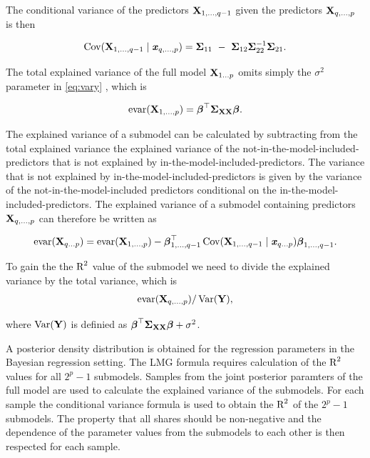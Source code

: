 \documentclass[11pt,a4paper,twoside]{book}\usepackage[]{graphicx}\usepackage[]{color}
\begin{document}
 The conditional variance of the predictors $ {\mathbf{X}}_{1 ,\dotsc, q-1} $ given the predictors  $ {\mathbf{X}}_{q ,\dotsc, p} $ is then
 
          \begin{align*} 
 \cov(\X_{1,\dotsc, q-1} \mid \x_{q ,\dotsc, p}) = \bSigma_{11}\ -\ \bSigma_{12} \bSigma_{22}^{-1}\bSigma_{21} .
       \end{align*}
       
       The total explained variance of the full model ${\mathbf{X}}_{1 \dots p}$ omits simply the $\sigma^2$ parameter in \eqref{eq:vary} , which is

      \begin{align*} 
        \text{evar}({\mathbf{X}}_{1 ,\dotsc, p}) = {\boldsymbol{\beta}}^\top {\boldsymbol{\Sigma}}{}_{{\mathbf{X}} {\mathbf{X}}}  {\boldsymbol{\beta}}. 
   \end{align*}

The explained variance of a submodel can be calculated by subtracting from the total explained variance the explained variance of the not-in-the-model-included-predictors that is not explained by in-the-model-included-predictors. The variance that is not explained by in-the-model-included-predictors is given by the variance of the not-in-the-model-included predictors conditional on the in-the-model-included-predictors. The explained variance of a submodel containing predictors ${\mathbf{X}}_{q ,\dotsc, p}$ can therefore be written as

       \begin{align} 
       \text{evar}({\mathbf{X}}_{q \dots p}) =  \text{evar}({\mathbf{X}}_{1  ,\dotsc, p}) - {\boldsymbol{\beta}}^\top_{1 ,\dotsc, q-1} \operatorname{Cov}({\mathbf{X}}_{1,\dotsc, {q-1}} \mid {\textbf{\textit{x}}}_{q \dots p}) {\boldsymbol{\beta}}_{1 ,\dotsc, {q-1}} . \label{eq:varsub} 
   \end{align}

To gain the the $\text{R}^2$ value of the submodel we need to divide the explained variance by the total variance, which is
       \begin{align*} 
\text{evar}({\mathbf{X}}_{q ,\dotsc, p}) / \operatorname{Var}({\mathbf{Y}}),   
\end{align*}

where $\operatorname{Var}({\mathbf{Y}})$ is definied as  ${\boldsymbol{\beta}}^\top {\boldsymbol{\Sigma}}{}_{{\mathbf{X}} {\mathbf{X}}}  {\boldsymbol{\beta}} + \sigma^2$.



A posterior density distribution is obtained for the regression parameters in the Bayesian regression setting. The LMG formula requires calculation of the $\text{R}^2$ values for all $2^p-1$ submodels. Samples from the joint posterior paramters of the full model are used to calculate the explained variance of the  submodels. For each sample the  conditional variance formula is used to obtain the $\text{R}^2$ of the $2^p-1$ submodels. The property that all shares should be non-negative and the dependence of the parameter values from the submodels to each other is then respected for each sample. 
\end{document}
